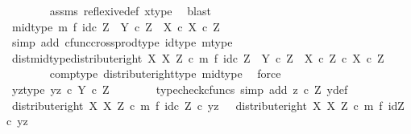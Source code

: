 \begin{isabellebody}
\ \ \ \ \ \ \isamarkupfalse%
\ assms\ reflexive{\isacharunderscore}{\kern0pt}def{}\ x{\isacharunderscore}{\kern0pt}type\ \isamarkupfalse%
\ blast\isanewline
\ \ \ \ \isamarkupfalse%
\ mid{\isacharunderscore}{\kern0pt}type{\isacharcolon}{\kern0pt}\ {\isachardoublequoteopen}m\ {\isasymtimes}\isactrlsub f\ id\isactrlsub c\ Z\ {\isacharcolon}{\kern0pt}\ Y\ {\isasymtimes}\isactrlsub c\ Z\ {\isasymrightarrow}\ {\isacharparenleft}{\kern0pt}X\ {\isasymtimes}\isactrlsub c\ X{\isacharparenright}{\kern0pt}\ {\isasymtimes}\isactrlsub c\ Z{\isachardoublequoteclose}\isanewline
\ \ \ \ \ \ \isamarkupfalse%
\ {\isacharparenleft}{\kern0pt}simp\ add{\isacharcolon}{\kern0pt}\ cfunc{\isacharunderscore}{\kern0pt}cross{\isacharunderscore}{\kern0pt}prod{\isacharunderscore}{\kern0pt}type\ id{\isacharunderscore}{\kern0pt}type\ m{\isacharunderscore}{\kern0pt}type{\isacharparenright}{\kern0pt}\isanewline
\ \ \ \ \isamarkupfalse%
\ dist{\isacharunderscore}{\kern0pt}mid{\isacharunderscore}{\kern0pt}type{\isacharcolon}{\kern0pt}{\isachardoublequoteopen}distribute{\isacharunderscore}{\kern0pt}right\ X\ X\ Z\ {\isasymcirc}\isactrlsub c\ m\ {\isasymtimes}\isactrlsub f\ id\isactrlsub c\ Z\ {\isacharcolon}{\kern0pt}\ Y\ {\isasymtimes}\isactrlsub c\ Z\ {\isasymrightarrow}\ {\isacharparenleft}{\kern0pt}X\ {\isasymtimes}\isactrlsub c\ Z{\isacharparenright}{\kern0pt}\ {\isasymtimes}\isactrlsub c\ X\ {\isasymtimes}\isactrlsub c\ Z{\isachardoublequoteclose}\isanewline
\ \ \ \ \ \ \isamarkupfalse%
\ comp{\isacharunderscore}{\kern0pt}type\ distribute{\isacharunderscore}{\kern0pt}right{\isacharunderscore}{\kern0pt}type\ mid{\isacharunderscore}{\kern0pt}type\ \isamarkupfalse%
\ force\isanewline
\ \ \ \ \isamarkupfalse%
\ yz{\isacharunderscore}{\kern0pt}type{\isacharcolon}{\kern0pt}\ {\isachardoublequoteopen}{\isasymlangle}y{\isacharcomma}{\kern0pt}z{\isasymrangle}\ {\isasymin}\isactrlsub c\ Y\ {\isasymtimes}\isactrlsub c\ Z{\isachardoublequoteclose}\isanewline
\ \ \ \ \ \ \isamarkupfalse%
\ {\isacharparenleft}{\kern0pt}typecheck{\isacharunderscore}{\kern0pt}cfuncs{\isacharcomma}{\kern0pt}\ simp\ add{\isacharcolon}{\kern0pt}\ {\isacartoucheopen}z\ {\isasymin}\isactrlsub c\ Z{\isacartoucheclose}\ y{\isacharunderscore}{\kern0pt}def{\isacharparenright}{\kern0pt}\isanewline
\ \ \ \ \isamarkupfalse%
\ {\isachardoublequoteopen}{\isacharparenleft}{\kern0pt}distribute{\isacharunderscore}{\kern0pt}right\ X\ X\ Z\ {\isasymcirc}\isactrlsub c\ m\ {\isasymtimes}\isactrlsub f\ id\isactrlsub c\ Z{\isacharparenright}{\kern0pt}\ {\isasymcirc}\isactrlsub c\ {\isasymlangle}y{\isacharcomma}{\kern0pt}z{\isasymrangle}\ \ {\isacharequal}{\kern0pt}\ distribute{\isacharunderscore}{\kern0pt}right\ X\ X\ Z\ {\isasymcirc}\isactrlsub c\ {\isacharparenleft}{\kern0pt}m\ {\isasymtimes}\isactrlsub f\ id{\isacharparenleft}{\kern0pt}Z{\isacharparenright}{\kern0pt}{\isacharparenright}{\kern0pt}\ {\isasymcirc}\isactrlsub c\ {\isasymlangle}y{\isacharcomma}{\kern0pt}z{\isasymrangle}{\isachardoublequoteclose}\isanewline

\end{isabellebody}
